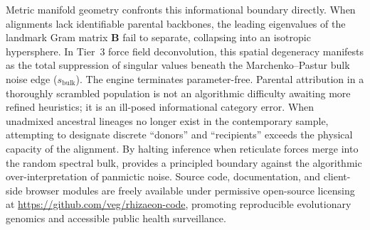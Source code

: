 Metric manifold geometry confronts this informational boundary directly.
When alignments lack identifiable parental backbones, the leading eigenvalues of the landmark Gram matrix $\mathbf{B}$ fail to separate, collapsing into an isotropic hypersphere.
In Tier~3 force field deconvolution, this spatial degeneracy manifests as the total suppression of singular values beneath the Marchenko--Pastur bulk noise edge ($s_{\text{bulk}}$).
The engine terminates parameter-free.
Parental attribution in a thoroughly scrambled population is not an algorithmic difficulty awaiting more refined heuristics; it is an ill-posed informational category error.
When unadmixed ancestral lineages no longer exist in the contemporary sample, attempting to designate discrete ``donors'' and ``recipients'' exceeds the physical capacity of the alignment.
By halting inference when reticulate forces merge into the random spectral bulk, \RhizAeon provides a principled boundary against the algorithmic over-interpretation of panmictic noise.
Source code, documentation, and client-side browser modules are freely available under permissive open-source licensing at \url{https://github.com/veg/rhizaeon-code}, promoting reproducible evolutionary genomics and accessible public health surveillance.
